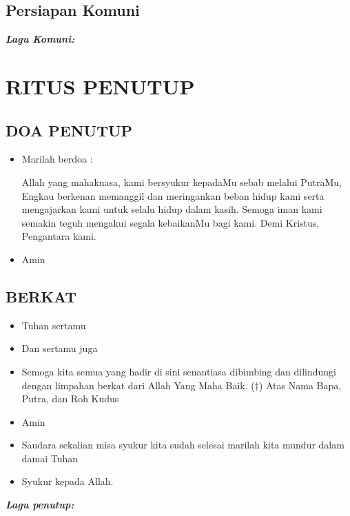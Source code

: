 \documentclass[a5paper,headsepline,titlepage,11pt,nnormalheadings]{scrbook}
\makeatletter
\newcommand{\BU}[1]{\begin{itemize} \item[U:] #1 \end{itemize}}
\newcommand{\BI}[1]{\begin{itemize} \item[I:] #1 \end{itemize}}
\newcommand{\laguagnusdei}{~}
\newcommand{\lagukomuni}{~}
\newcommand{\lagupenutup}{~ }
\newcommand{\lagu}[1]{%
  {\parindent \z@ \normalfont
    \interlinepenalty\@M \bfseries \emph{#1}\par\nobreak \vskip 20\p@ }}
\makeatother
\begin{document}

\subsection*{Persiapan Komuni}

\lagu{Lagu Komuni: \lagukomuni}

\section*{RITUS PENUTUP}

\subsection*{DOA PENUTUP}
\BI{Marilah berdoa :
 
Allah yang mahakuasa, kami bersyukur kepadaMu sebab melalui PutraMu, Engkau berkenan memanggil dan meringankan beban hidup kami serta mengajarkan kami untuk selalu hidup dalam kasih. Semoga iman kami semakin teguh mengakui segala kebaikanMu bagi kami. Demi Kristus, Pengantara kami. }
\BU{Amin} 

\subsection*{BERKAT}
\BI{Tuhan sertamu}
\BU{Dan sertamu juga}
\BI{Semoga kita semua yang hadir di sini senantiasa dibimbing dan dilindungi dengan limpahan berkat dari Allah Yang Maha Baik. ($\dagger$) Atas Nama Bapa, Putra, dan Roh Kudus}

\BU{Amin}

\BI{Saudara sekalian misa syukur kita sudah selesai marilah kita mundur dalam damai Tuhan}
\BU{Syukur kepada Allah.}

\lagu{Lagu penutup: \lagupenutup}
\end{document}
